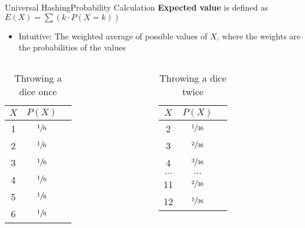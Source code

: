 \begin{frame}{Universal Hashing}{Probability Calculation}
  \textbf{Expected value} is defined as  {\color{Mittel-Blau}$E(X)  = \sum \left(k \cdot P(X = k)\right)$}
  \vspace*{0em}
  \begin{itemize}
    \item <2->
      Intuitive: The weighted average of possible values of {\color{Mittel-Blau}$X$}, where
      the weights are the probabilities of the values
  \end{itemize}
  \vspace*{-1.0em}
 \begin{columns}
   \begin{column}{0.5\linewidth}
     \begin{table}[!h]
       \small{
     \caption{Throwing a dice once}
    \label{tab:probabilities:value_rolling_dice_once}
    \begin{tabularx}{0.25\linewidth}{c|cc}
      {\color{Mittel-Blau}$X$} & {\color{Mittel-Blau}$P(X)$}\\
      \midrule
      1 & $\sfrac{1}{6}$\\
      2 & $\sfrac{1}{6}$\\
      3 & $\sfrac{1}{6}$\\
      4 & $\sfrac{1}{6}$\\
      5 & $\sfrac{1}{6}$\\
      6 & $\sfrac{1}{6}$\\
    \end{tabularx}}
  \end{table}  
   \end{column}
   \begin{column}{0.5\linewidth}
     \begin{table}[!h]
       \small{
    \caption{Throwing a dice twice}
    \label{tab:probabilities:value_rolling_dice_twice}
    \begin{tabularx}{0.275\linewidth}{c|cc}
      {\color{Mittel-Blau}$X$ }&{\color{Mittel-Blau} $P(X)$}\\
      \midrule
      2 & $\sfrac{1}{36}$\\
      3 & $\sfrac{2}{36}$\\
      4 & $\sfrac{3}{36}$\\
      $\dots$ & $\dots$\\
      11 & $\sfrac{2}{36}$\\
      12 & $\sfrac{1}{36}$\\
    \end{tabularx}}

\end{table}
\end{column}
\end{columns}
\end{frame}
